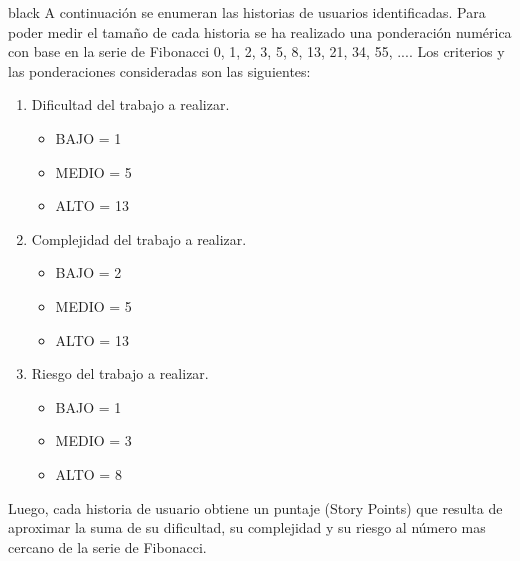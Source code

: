 \documentclass[
11pt, %
]{charter}
\begin{document}
\begin{consigna}{black}
A continuación se enumeran las historias de usuarios identificadas. Para poder medir el tamaño de cada historia se ha realizado una ponderación numérica con base en la serie de Fibonacci 0, 1, 2, 3, 5, 8, 13, 21, 34, 55, .... 
Los criterios y las ponderaciones consideradas son las siguientes:
\begin{enumerate}
	\item Dificultad del trabajo a realizar.
	\begin{itemize}
		\item BAJO = 1
		\item MEDIO = 5
		\item ALTO = 13
	\end{itemize}	
	\item Complejidad del trabajo a realizar.
	\begin{itemize}
		\item BAJO = 2
		\item MEDIO = 5
		\item ALTO = 13
	\end{itemize}	
	\item Riesgo del trabajo a realizar.
	\begin{itemize}
		\item BAJO = 1
		\item MEDIO = 3
		\item ALTO = 8
	\end{itemize}	
\end{enumerate}
Luego, cada historia de usuario obtiene un puntaje (Story Points) que resulta de aproximar la suma de su dificultad, su complejidad y su riesgo al número mas cercano de la serie de Fibonacci.


\end{consigna}
\end{document}
